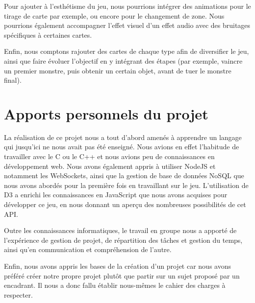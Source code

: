 \documentclass[12pt]{report}
\begin{document}
  Pour ajouter à l'esthétisme du jeu, nous pourrions intégrer des animations pour le tirage de carte par exemple, ou encore pour le changement de zone. Nous pourrions également accompagner l'effet visuel d'un effet audio avec des bruitages spécifiques à certaines cartes.

  Enfin, nous comptons rajouter des cartes de chaque type afin de diversifier le jeu, ainsi que faire évoluer l'objectif en y intégrant des étapes (par exemple, vaincre un premier monstre, puis obtenir un certain objet, avant de tuer le monstre final).

  \section*{Apports personnels du projet}
  La réalisation de ce projet nous a tout d'abord amenés à apprendre un langage qui jusqu'ici ne nous avait pas été enseigné. Nous avions en effet l'habitude de travailler avec le C ou le C++ et nous avions peu de connaissances en développement web. Nous avons également appris à utiliser NodeJS et notamment les WebSockets, ainsi que la gestion de base de données NoSQL que nous avons abordés pour la première fois en travaillant sur le jeu. L'utilisation de D3 a enrichi les connaissances en JavaScript que nous avons acquises pour développer ce jeu, en nous donnant un aperçu des nombreuses possibilités de cet API.

  Outre les connaissances informatiques, le travail en groupe nous a apporté de l'expérience de gestion de projet, de répartition des tâches et gestion du temps, ainsi qu'en communication et compréhension de l'autre.

  Enfin, nous avons appris les bases de la création d'un projet car nous avons préféré créer notre propre projet plutôt que partir sur un sujet proposé par un encadrant. Il nous a donc fallu établir nous-mêmes le cahier des charges à respecter.
\end{document}
